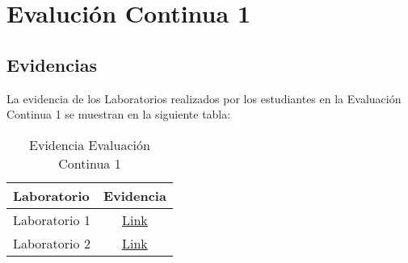 \chapter{Evalución Continua 1}
\newpage



\pagestyle{empty} %

\section{Evidencias}
La evidencia de los Laboratorios realizados por los estudiantes en la Evaluación Continua 1 se muestran en la siguiente tabla:

\begin{table}[h]
\centering
\begin{tabular}{l|c}
\hline
\textbf{Laboratorio} & 
\textbf{Evidencia} 
\\ \hline
Laboratorio 1 &
\href{https://drive.google.com/drive/folders/1Kc_Wca-XdFIgpf8uxClm6olsZYaXV6sO?usp=sharing}{Link}
\\ \hline
Laboratorio 2 &
\href{https://drive.google.com/drive/folders/1nGgNeU5bXNEJFV-SdGf-k6WlP879ufPk?usp=sharing}{Link}
\\ \hline
\end{tabular}
\caption{Evidencia Evaluación Continua 1}
\label{tab:evidencia_evaluacion_continua_1} %
\end{table}

